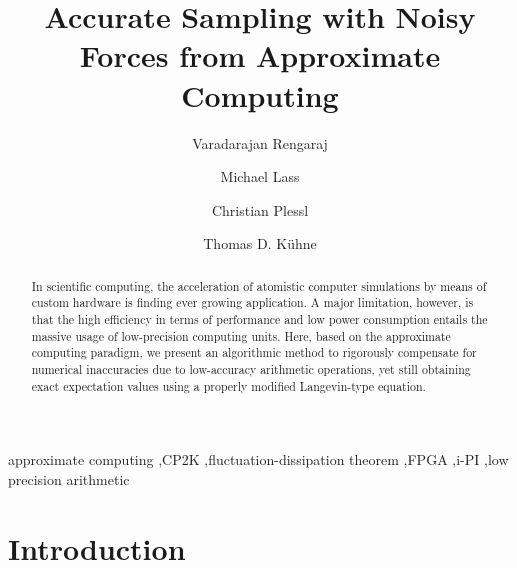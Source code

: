 \documentclass[preprint]{elsarticle}
\begin{document}
\title{Accurate Sampling with Noisy Forces from Approximate Computing}

\begin{abstract}
In scientific computing, the acceleration of atomistic computer simulations by means of custom hardware is finding ever growing application.
A major limitation, however, is that the high efficiency in terms of performance and low power consumption entails the massive usage of low-precision computing units. Here, based on the approximate computing paradigm, we present an algorithmic method to rigorously compensate for numerical inaccuracies due to low-accuracy arithmetic operations, yet still obtaining exact expectation values using a properly modified Langevin-type equation.
\end{abstract}

\begin{keyword}
approximate computing \sep CP2K \sep fluctuation-dissipation theorem \sep FPGA \sep i-PI \sep low precision arithmetic
\end{keyword}

\author[dcm,cs]{Varadarajan Rengaraj}
\author[cs,pc2]{Michael Lass}
\author[cs,pc2]{Christian Plessl}
\author[dcm,pc2,cssd]{Thomas D. K\"uhne}


\address[dcm]{Dynamics of Condensed Matter, Department of Chemistry, \\ Paderborn University, Warburger Str. 100, 33098 Paderborn, Germany}
\address[cs]{Department of Computer Science, \\ Paderborn University, Warburger Str. 100, 33098 Paderborn, Germany}
\address[pc2]{Paderborn Center for Parallel Computing, \\ Paderborn University, Warburger Str. 100, 33098 Paderborn, Germany}
\address[cssd]{Center for Sustainable Systems Design, \\ Paderborn University, Warburger Str. 100, 33098 Paderborn, Germany}

\maketitle


\section{Introduction}
\end{document}
